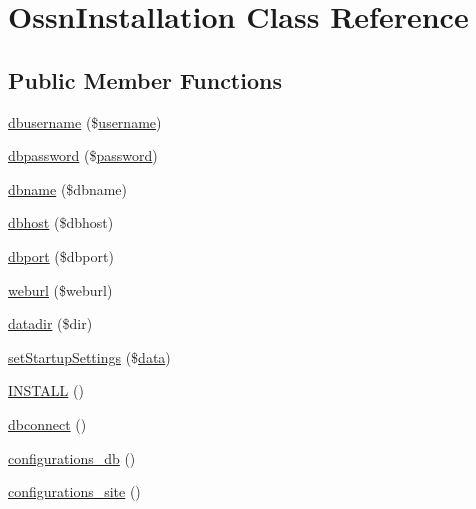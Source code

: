 \hypertarget{class_ossn_installation}{}\section{Ossn\+Installation Class Reference}
\label{class_ossn_installation}
\subsection*{Public Member Functions}
\begin{DoxyCompactItemize}
\item 
\hyperlink{class_ossn_installation_a0c92019262c7e688db382026ee3911b6}{dbusername} (\$\hyperlink{actions_2account_8php_ac9b3768ccc688c2ff0811c50c107a02e}{username})
\item 
\hyperlink{class_ossn_installation_a3d22db5f08a749190128905052d042f1}{dbpassword} (\$\hyperlink{actions_2account_8php_a3ef39d3ee8b2bcca6a288308549ccb44}{password})
\item 
\hyperlink{class_ossn_installation_a7426b71c5128d0b2289e31de5e65da3e}{dbname} (\$dbname)
\item 
\hyperlink{class_ossn_installation_aab963d39a7d3030fd251f10644226920}{dbhost} (\$dbhost)
\item 
\hyperlink{class_ossn_installation_a8fd9f228755d82e4248e63a6f3a70e3d}{dbport} (\$dbport)
\item 
\hyperlink{class_ossn_installation_a2f1faa6db04c6d365df8867a330fc261}{weburl} (\$weburl)
\item 
\hyperlink{class_ossn_installation_a161febc129e8bd93e0308a3c644fb28e}{datadir} (\$dir)
\item 
\hyperlink{class_ossn_installation_a59fde8d7e5128534417c8223beb206d8}{set\+Startup\+Settings} (\$\hyperlink{components_2_ossn_comments_2actions_2comment_2edit_8php_a2b67189b42ab547221cb2a6408f4746a}{data})
\item 
\hyperlink{class_ossn_installation_a47088f73359294d8fde4145dab21e652}{I\+N\+S\+T\+A\+LL} ()
\item 
\hyperlink{class_ossn_installation_a707c18c51142bb524e64b348d64a1675}{dbconnect} ()
\item 
\hyperlink{class_ossn_installation_a3350c132243a5c1185002ee72d3db987}{configurations\+\_\+db} ()
\item 
\hyperlink{class_ossn_installation_a7dd5d93d27eed5a8ce5c7353c5ba272d}{configurations\+\_\+site} ()
\end{DoxyCompactItemize}
